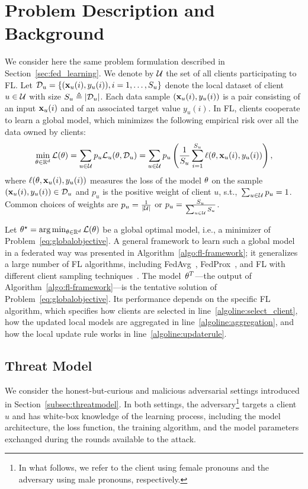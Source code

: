 \section{Problem Description and Background}
We consider here the same problem formulation described in Section~\ref{sec:fed_learning}. We denote by $\mathcal{U}$ the set of all clients participating to FL. 
Let $\mathcal{D}_u = \{({\mathbf{x}}_u(i), y_u(i)), i=1,\dots, S_u\}$ denote the local dataset of client $u\in \mathcal{U}$ with size $S_u\triangleq |\mathcal{D}_u|$.  Each data sample $({\mathbf{x}}_u(i), y_u(i))$ is a pair consisting of an input ${\mathbf{x}}_u(i)$ and of an associated target value $y_u(i)$.
In FL, clients cooperate to learn a global model, which minimizes the following empirical risk over all the data owned by clients:
\begin{equation}
\label{eq:globalobjective}
\min_{\theta \in \mathbb{R}^d} {\mathcal{L}}(\theta) 
= \sum_{u \in \mathcal{U}} p_u {\mathcal{L}_u}(\theta, \mathcal{D}_u)
= \sum_{u \in \mathcal{U}} p_u \left( \frac{1}{S_u} \sum_{i=1}^{S_u} \ell(\theta, {\mathbf{x}}_u(i), y_u(i)) \right),
\end{equation}
where $\ell(\theta, {\mathbf{x}}_u(i), y_u(i))$ measures the loss of the model $\theta$ on the sample $({\mathbf{x}}_u(i), y_u(i))\in \mathcal{D}_u$ and $p_u$ is the positive weight of client $u$, s.t.,~$\sum_{u\in \mathcal{U}} p_u = 1$. Common choices of weights are $p_u =\frac{1}{|\mathcal{U}|}$ or $p_u =\frac{S_u}{\sum_{u\in \mathcal{U}}S_u}$.


Let $\theta^\star = \arg\min_{\theta \in \mathbb{R}^d} {\mathcal{L}}(\theta)$ be a global optimal model, i.e., a minimizer of Problem~\eqref{eq:globalobjective}. 
A general framework to learn such a global model in a federated way was presented in Algorithm~\ref{algo:fl-framework}; it generalizes a large number of FL algorithms, including FedAvg~\cite{pmlr-v54-mcmahan17a}, FedProx~\cite{fedprox}, and FL with different client sampling techniques~\cite{nishio2019client, chen2020optimal, cho2020client}. The model~$\theta^T$---the output of Algorithm~\ref{algo:fl-framework}---is the tentative solution of Problem~\eqref{eq:globalobjective}. Its performance depends on the specific FL algorithm, which specifies how clients are selected in line~\ref{algoline:select_client}, how the updated local models are aggregated in line~\ref{algoline:aggregation}, and how the local update rule works in line~\ref{algoline:updaterule}.

\subsection{Threat Model}
We consider the honest-but-curious and malicious adversarial settings introduced in Section~\ref{subsec:threatmodel}. In both settings, the adversary\footnote{In what follows, we refer to the client using female pronouns and the adversary using male pronouns, respectively.} targets a client $u$ and has white-box knowledge of the learning process, including the model architecture, the loss function, the training algorithm, and the model parameters exchanged during the rounds available to the attack.
